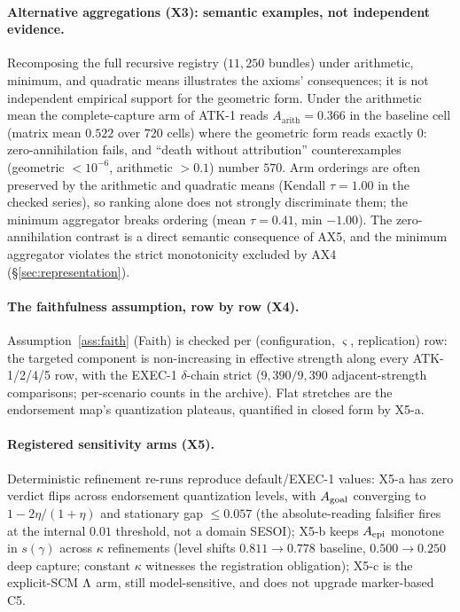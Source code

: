 \paragraph{Alternative aggregations (X3): semantic examples, not independent evidence.}
Recomposing the full recursive registry ($11{,}250$ bundles) under
arithmetic, minimum, and quadratic means illustrates the axioms' consequences;
it is not independent empirical support for the geometric form. Under the
arithmetic mean the complete-capture arm of ATK-1 reads
$A_{\mathrm{arith}}=0.366$ in the baseline cell (matrix mean $0.522$ over
$720$ cells) where the geometric form reads exactly $0$: zero-annihilation
fails, and ``death without attribution'' counterexamples (geometric
$<10^{-6}$, arithmetic $>0.1$) number $570$. Arm orderings are often preserved
by the arithmetic and quadratic means (Kendall $\tau=1.00$ in the checked
series), so ranking alone does not strongly discriminate them; the minimum
aggregator breaks ordering (mean $\tau=0.41$, min $-1.00$). The
zero-annihilation contrast is a direct semantic consequence of AX5, and the
minimum aggregator violates the strict monotonicity excluded by AX4
(\S\ref{sec:representation}).

\paragraph{The faithfulness assumption, row by row (X4).}
Assumption~\ref{ass:faith} (Faith) is checked per
(configuration, $\varsigma$, replication) row: the targeted component is
non-increasing in effective strength along every ATK-1/2/4/5 row, with the
EXEC-1 $\delta$-chain strict ($9{,}390/9{,}390$ adjacent-strength comparisons;
per-scenario counts in the archive). Flat stretches are the endorsement map's
quantization plateaus, quantified in closed form by X5-a.

\paragraph{Registered sensitivity arms (X5).}
Deterministic refinement re-runs reproduce default/EXEC-1 values: X5-a has
zero verdict flips across endorsement quantization levels, with $A_{\mathrm{goal}}$
converging to $1-2\eta/(1+\eta)$ and stationary gap $\le0.057$ (the
absolute-reading falsifier fires at the internal $0.01$ threshold, not a
domain SESOI); X5-b keeps $A_{\mathrm{epi}}$ monotone in $s(\gamma)$ across $\kappa$
refinements (level shifts $0.811\to0.778$ baseline, $0.500\to0.250$ deep
capture; constant $\kappa$ witnesses the registration obligation); X5-c is
the explicit-SCM $\Lambda$ arm, still model-sensitive, and does not upgrade
marker-based C5.

